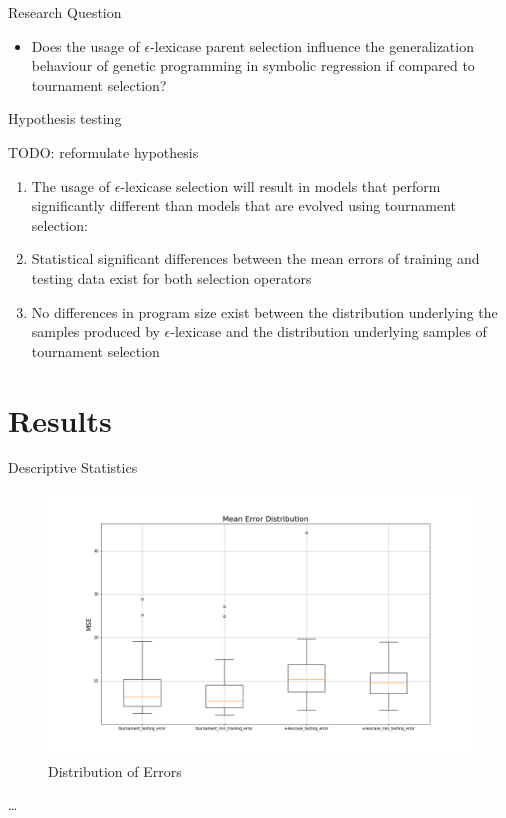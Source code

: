 \documentclass[
  ignorenonframetext,
]{beamer}
\providecommand{\tightlist}{%
  \setlength{\itemsep}{0pt}\setlength{\parskip}{0pt}}
\begin{document}
\begin{frame}{Research Question}
\protect\hypertarget{research-question-1}{}
\begin{itemize}
\tightlist
\item
  Does the usage of \(\epsilon\)-lexicase parent selection influence the
  generalization behaviour of genetic programming in symbolic regression
  if compared to tournament selection?
\end{itemize}

\begin{block}{Hypothesis testing}
\protect\hypertarget{hypothesis-testing}{}
\begin{block}{TODO: reformulate hypothesis}
\protect\hypertarget{todo-reformulate-hypothesis}{}
\begin{enumerate}
\tightlist
\item
  The usage of \(\epsilon\)-lexicase selection will result in models
  that perform significantly different than models that are evolved
  using tournament selection:
\item
  Statistical significant differences between the mean errors of
  training and testing data exist for both selection operators
\item
  No differences in program size exist between the distribution
  underlying the samples produced by \(\epsilon\)-lexicase and the
  distribution underlying samples of tournament selection
\end{enumerate}
\end{block}
\end{block}
\end{frame}

\hypertarget{results}{%
\section{Results}\label{results}}

\begin{frame}{Descriptive Statistics}
\protect\hypertarget{descriptive-statistics}{}
\begin{figure}
\centering
\includegraphics{../plots/mean_error_boxplot_all.png}
\caption{Distribution of Errors}
\end{figure}

\ldots{}
\end{frame}
\end{document}
